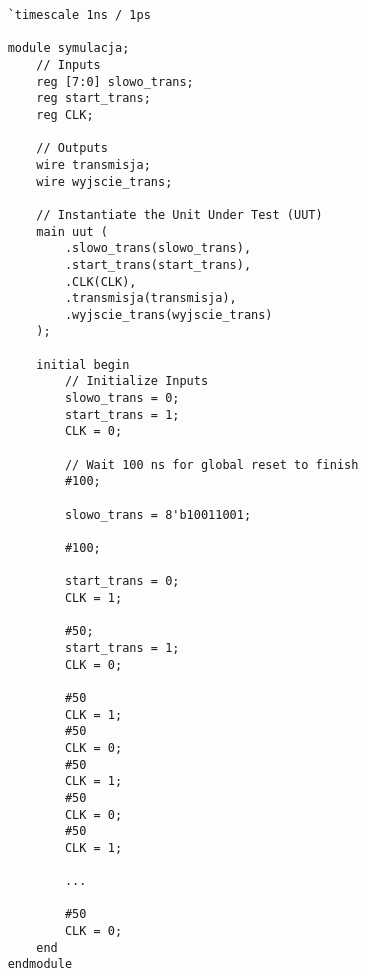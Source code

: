 \begin{lstlisting}
    `timescale 1ns / 1ps

    module symulacja;
        // Inputs
        reg [7:0] slowo_trans;
        reg start_trans;
        reg CLK;
    
        // Outputs
        wire transmisja;
        wire wyjscie_trans;
    
        // Instantiate the Unit Under Test (UUT)
        main uut (
            .slowo_trans(slowo_trans), 
            .start_trans(start_trans), 
            .CLK(CLK), 
            .transmisja(transmisja), 
            .wyjscie_trans(wyjscie_trans)
        );
    
        initial begin
            // Initialize Inputs
            slowo_trans = 0;
            start_trans = 1;
            CLK = 0;
    
            // Wait 100 ns for global reset to finish
            #100;
           
            slowo_trans = 8'b10011001;
             
            #100;
            
            start_trans = 0;
            CLK = 1;
            
            #50;
            start_trans = 1;
            CLK = 0;
            
            #50
            CLK = 1;
            #50
            CLK = 0;
            #50
            CLK = 1;
            #50
            CLK = 0;
            #50
            CLK = 1;
            
            ...

            #50
            CLK = 0;
        end
    endmodule        
\end{lstlisting}